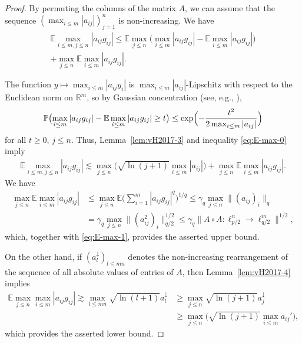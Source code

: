 \documentclass[a4paper]{amsart}
\theoremstyle{definition}
\theoremstyle{remark}
\numberwithin{equation}{section}
\newcommand*{\RR}{\mathbb{R}}
\newcommand*{\EE}{\mathbb{E}}
\newcommand*{\PP}{\mathbb{P}}
\newcommand*{\hadprod}{\mathbin{\circ}} %
\newcommand*{\rearr}{\downarrow} %
\begin{document}
\begin{proof}
	 By permuting the columns of the matrix $A$, we can  assume that the sequence $(\max_{i\le m} |a_{ij}|)_{j=1}^n$ is non-increasing. 
	 We have
\begin{multline}	\label{eq:E-max-0}
    \EE\max_{i\le m,j\le n} |a_{ij} g_{ij}| \le \EE \max_{j\le n} \Big(\max_{i\le m} |a_{ij} g_{ij}| - \EE \max_{i\le m} |a_{ij} g_{ij}|\Big) \\ + \max_{j\le n} \EE \max_{i\le m}|a_{ij}g_{ij}|.
\end{multline}

The function $y \mapsto \max_{i\le m} |a_{ij} y_i|$ is $\max_{i\le m} |a_{ij}|$-Lipschitz with respect to the Euclidean norm on $\RR^m$, so by Gaussian concentration (see, e.g., \cite[Chapter~5.1]{Ledoux}),
\[
	\PP\bigl(\max_{i\le m} |a_{ij} g_{ij}| - \EE \max_{i\le m} |a_{ij} g_{ij}| \ge t \bigr) \le \exp \Bigl(-\frac{t^2} {2\max_{i\le m} |a_{ij}|}\Bigr)
\]
for all  $t\ge 0$, $j\leq n$.
Thus, Lemma~\ref{lem:vH2017-3} and inequality \eqref{eq:E-max-0} imply
\begin{align}\label{eq:E-max-1}
  \EE\max_{i\le m,j\le n} |a_{ij} g_{ij}|  \lesssim \max_{j\le n} \Big(\sqrt{\ln(j+1)}\max_{i\le m} |a_{ij}|\Big)+
\max_{j\le n} \EE \max_{i\le m}|a_{ij}g_{ij}|.
\end{align}
We have
\begin{align*}
  \max_{j\le n} \EE \max_{i\le m}|a_{ij}g_{ij}|
  & \le \max_{j\le n} \EE  \Big(\sum_{i=1}^m |a_{ij} g_{ij}|^q\Big)^{1/q} \le \gamma_q  \max_{j\le n} \|(a_{ij})_{i}\|_q \\
 & = \gamma_q  \max_{j\le n} \|(a_{ij}^2)_{i}\|_{q/2}^{1/2} \le
\gamma_q \|A\hadprod A \colon \ell^n_{p/2} \to \ell^m_{q/2} \|^{1/2},
\end{align*}
which, together with \eqref{eq:E-max-1}, provides the asserted upper bound.

On the other hand, if $(a_{l}^{\rearr{}})_{l\le mn}$ denotes the non-increasing rearrangement of the sequence of all absolute values of entries of $A$, then   Lemma~\ref{lem:vH2017-4} implies 
\begin{align*}		\nonumber
	\EE\max_{j\le n} \max_{i\le m}|a_{ij} g_{ij}| 
	\gtrsim \max_{l\le mn} \sqrt{\ln (l+1)}a_l^{\rearr{}} 
	&\ge \max_{j\le n} \sqrt{\ln(j+1)} a_{j}^{\rearr{}} 
	\\
	& \ge \max_{j\le n} \Big(\sqrt{\ln(j+1)}\max_{i\le m} a_{ij}'\Big),
\end{align*}
which provides the asserted lower bound.
\end{proof}
\end{document}
